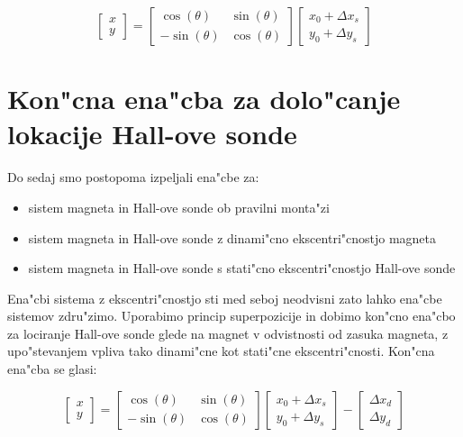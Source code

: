 \begin{equation}
\label{equ:rotacija_hall_stat}
\begin{bmatrix} x\\y \end{bmatrix}=
\begin{bmatrix} \cos(\theta)&\sin(\theta)\\-\sin(\theta)&\cos(\theta) \end{bmatrix}
\begin{bmatrix} x_0+\Delta x_s\\y_0+\Delta y_s \end{bmatrix}
\end{equation}







\section{Kon"cna ena"cba za dolo"canje lokacije Hall-ove sonde}

Do sedaj smo postopoma izpeljali ena"cbe za:
\begin{itemize}
  \item sistem magneta in Hall-ove sonde ob pravilni monta"zi
  \item sistem magneta in Hall-ove sonde z dinami"cno ekscentri"cnostjo magneta
  \item sistem magneta in Hall-ove sonde s stati"cno ekscentri"cnostjo Hall-ove sonde
\end{itemize}

Ena"cbi sistema z ekscentri"cnostjo sti med seboj neodvisni zato lahko ena"cbe sistemov zdru"zimo. Uporabimo princip superpozicije in dobimo kon"cno ena"cbo za lociranje Hall-ove sonde glede na magnet v odvistnosti od zasuka magneta, z upo"stevanjem vpliva tako dinami"cne kot stati"cne ekscentri"cnosti. Kon"cna ena"cba se glasi:

\begin{equation}
\label{equ:rotacija_hall_koncna}
\begin{bmatrix} x\\y \end{bmatrix}=
\begin{bmatrix} \cos(\theta)&\sin(\theta)\\-\sin(\theta)&\cos(\theta) \end{bmatrix}
\begin{bmatrix} x_0+\Delta x_s\\y_0+\Delta y_s \end{bmatrix}-
\begin{bmatrix} \Delta x_d\\\Delta y_d \end{bmatrix}
\end{equation}


